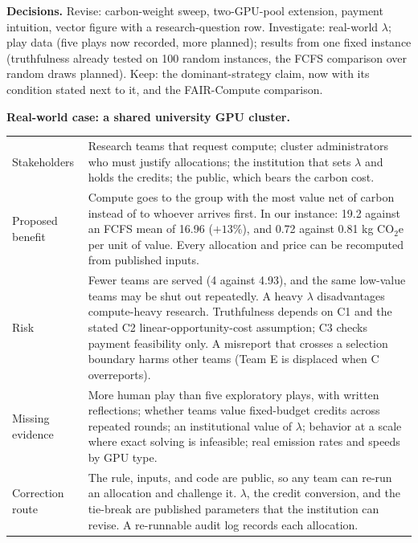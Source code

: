 \textbf{Decisions.} Revise: carbon-weight sweep, two-GPU-pool extension, payment intuition, vector figure with a research-question row. Investigate: real-world $\lambda$; play data (five plays now recorded, more planned); results from one fixed instance (truthfulness already tested on 100 random instances, the FCFS comparison over random draws planned). Keep: the dominant-strategy claim, now with its condition stated next to it, and the FAIR-Compute comparison.

\textbf{Real-world case: a shared university GPU cluster.}

{\footnotesize
\begin{tabularx}{\columnwidth}{@{}p{1.6cm}Y@{}}\toprule
Stakeholders & Research teams that request compute; cluster administrators who must justify allocations; the institution that sets $\lambda$ and holds the credits; the public, which bears the carbon cost.\\
Proposed benefit & Compute goes to the group with the most value net of carbon instead of to whoever arrives first. In our instance: 19.2 against an FCFS mean of 16.96 ($+13\%$), and 0.72 against 0.81 kg CO$_2$e per unit of value. Every allocation and price can be recomputed from published inputs.\\
Risk & Fewer teams are served (4 against 4.93), and the same low-value teams may be shut out repeatedly. A heavy $\lambda$ disadvantages compute-heavy research. Truthfulness depends on C1 and the stated C2 linear-opportunity-cost assumption; C3 checks payment feasibility only. A misreport that crosses a selection boundary harms other teams (Team E is displaced when C overreports).\\
Missing evidence & More human play than five exploratory plays, with written reflections; whether teams value fixed-budget credits across repeated rounds; an institutional value of $\lambda$; behavior at a scale where exact solving is infeasible; real emission rates and speeds by GPU type.\\
Correction route & The rule, inputs, and code are public, so any team can re-run an allocation and challenge it. $\lambda$, the credit conversion, and the tie-break are published parameters that the institution can revise. A re-runnable audit log records each allocation.\\\bottomrule
\end{tabularx}}

